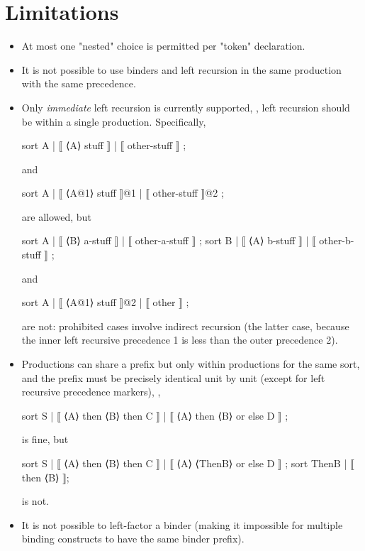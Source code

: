 \documentclass[11pt]{article} %
\begin{document}
\section{Limitations}\label{app:limits}

\begin{itemize}

\item At most one "nested" choice is permitted per "token" declaration.

\item It is not possible to use binders and left recursion in the same production with the same
  precedence.

\item Only \emph{immediate} left recursion is currently supported, \ie, left recursion should be
  within a single production. Specifically,
  \begin{hacs}
sort A | ⟦ ⟨A⟩ stuff ⟧ | ⟦ other-stuff ⟧ ;
  \end{hacs}
  and 
  \begin{hacs}
sort A | ⟦ ⟨A@1⟩ stuff ⟧@1 | ⟦ other-stuff ⟧@2 ;
  \end{hacs}
  are allowed, but
  \begin{hacs}
sort A | ⟦ ⟨B⟩ a-stuff ⟧ | ⟦ other-a-stuff ⟧ ;
sort B | ⟦ ⟨A⟩ b-stuff ⟧ | ⟦ other-b-stuff ⟧ ;
  \end{hacs}
  and 
  \begin{hacs}
sort A  | ⟦ ⟨A@1⟩ stuff ⟧@2 | ⟦ other ⟧ ;
  \end{hacs}
  are not: prohibited cases involve indirect recursion (the latter case, because the inner left
  recursive precedence 1 is less than the outer precedence 2).

\item Productions can share a prefix but only within productions for the same sort, and the prefix
  must be precisely identical unit by unit (except for left recursive precedence markers), \ie,
  \begin{code}
sort S | ⟦ ⟨A⟩ then ⟨B⟩ then C ⟧
       | ⟦ ⟨A⟩ then ⟨B⟩ or else D ⟧ ;
  \end{code}
  is fine, but
  \begin{code}
sort S | ⟦ ⟨A⟩ then ⟨B⟩ then C ⟧
       | ⟦ ⟨A⟩ ⟨ThenB⟩ or else D ⟧ ;
sort ThenB | ⟦ then ⟨B⟩ ⟧;
  \end{code}
  is not.

\item It is not possible to left-factor a binder (making it impossible for multiple binding
  constructs to have the same binder prefix).


\end{itemize}
\end{document}
